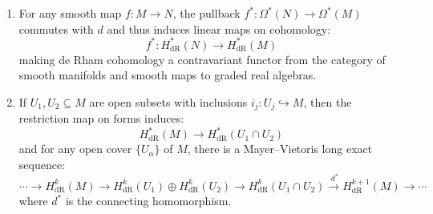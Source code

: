 \begin{definition}
\begin{enumerate}
    \item For any smooth map $f: M \to N$, the pullback $f^*: \Omega^*(N) \to \Omega^*(M)$ commutes with $d$ and thus induces linear maps on cohomology:
    $$ f^*: H^*_{\mathrm{dR}}(N) \to H^*_{\mathrm{dR}}(M) $$
    making de Rham cohomology a contravariant functor from the category of smooth manifolds and smooth maps to graded real algebras.

    \item If $U_1, U_2 \subseteq M$ are open subsets with inclusions $i_j: U_j \hookrightarrow M$, then the restriction map on forms induces:
    $$ H^*_{\mathrm{dR}}(M) \to H^*_{\mathrm{dR}}(U_1 \cap U_2) $$
    and for any open cover $\{U_\alpha\}$ of $M$, there is a Mayer--Vietoris long exact sequence:
    $$ \cdots \to H^k_{\mathrm{dR}}(M) \to H^k_{\mathrm{dR}}(U_1) \oplus H^k_{\mathrm{dR}}(U_2) \to H^k_{\mathrm{dR}}(U_1 \cap U_2) \xrightarrow{\ d^* } H^{k+1}_{\mathrm{dR}}(M) \to \cdots $$
    where $d^*$ is the connecting homomorphism.
\end{enumerate}

\end{definition}
